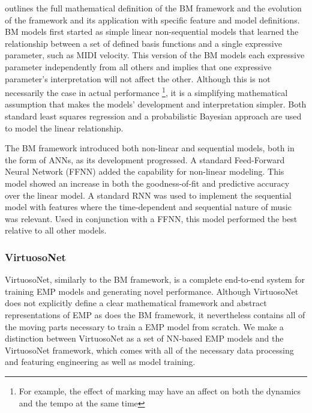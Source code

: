 \citet{eduardo2018computational} outlines the full mathematical definition of the BM framework and the evolution of the framework and its application with specific feature and model definitions. BM models first started as simple linear non-sequential models that learned the relationship between a set of defined basis functions and a single expressive parameter, such as MIDI velocity. This version of the BM models each expressive parameter independently from all others and implies that one expressive parameter's interpretation will not affect the other. Although this is not necessarily the case in actual performance \footnote{For example, the effect of  marking may have an affect on both the dynamics and the tempo at the same time}, it is a simplifying mathematical assumption that makes the models' development and interpretation simpler. Both standard least squares regression and a probabilistic Bayesian approach are used to model the linear relationship. 

The BM framework introduced both non-linear and sequential models, both in the form of ANNs, as its development progressed. A standard Feed-Forward Neural Network (FFNN) added the capability for non-linear modeling. This model showed an increase in both the goodness-of-fit and predictive accuracy over the linear model. A standard RNN was used to implement the sequential model with features where the time-dependent and sequential nature of music was relevant. Used in conjunction with a FFNN, this model performed the best relative to all other models.

\newcommand{\vnet}{VirtuosoNet}
\newcommand{\vnetf}{VirtuosoNet framework}

\subsubsection{\vnet{}}
\vnet{}, similarly to the BM framework, is a complete end-to-end system for training EMP models and generating novel performance. Although \vnet{} does not explicitly define a clear mathematical framework and abstract representations of EMP as does the BM framework, it nevertheless contains all of the moving parts necessary to train a EMP model from scratch. We make a distinction between \vnet{} as a set of NN-based EMP models and the \vnetf, which comes with all of the necessary data processing and featuring engineering as well as model training. 


